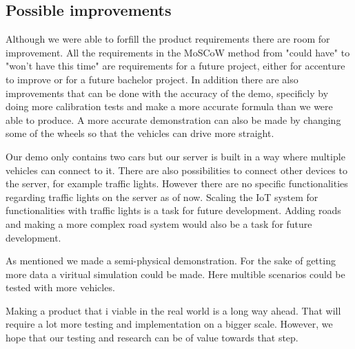 \subsection{Possible improvements}

Although we were able to forfill the product requirements there are room for improvement. All the requirements in the MoSCoW method from "could have" to "won't have this time" are requirements for a future project, either for accenture to improve or for a future bachelor project. In addition there are also improvements that can be done with the accuracy of the demo, specificly by doing more calibration tests and make a more accurate formula than we were able to produce. A more accurate demonstration can also be made by changing some of the wheels so that the vehicles can drive more straight.

Our demo only contains two cars but our server is built in a way where multiple vehicles can connect to it. There are also possibilities to connect other devices to the server, for example traffic lights. However there are no specific functionalities regarding traffic lights on the server as of now. Scaling the IoT system for functionalities with traffic lights is a task for future development. Adding roads and making a more complex road system would also be a task for future development. 

As mentioned we made a semi-physical demonstration. For the sake of getting more data a viritual simulation could be made. Here multible scenarios could be tested with more vehicles.  

Making a product that i viable in the real world is a long way ahead. That will require a lot more testing and implementation on a bigger scale. However, we hope that our testing and research can be of value towards that step.
